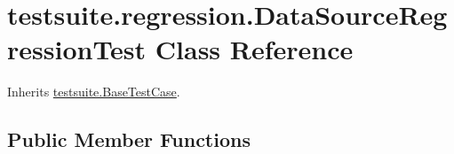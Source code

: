 \hypertarget{classtestsuite_1_1regression_1_1_data_source_regression_test}{}\section{testsuite.\+regression.\+Data\+Source\+Regression\+Test Class Reference}
\label{classtestsuite_1_1regression_1_1_data_source_regression_test}


Inherits \mbox{\hyperlink{classtestsuite_1_1_base_test_case}{testsuite.\+Base\+Test\+Case}}.

\subsection*{Public Member Functions}
